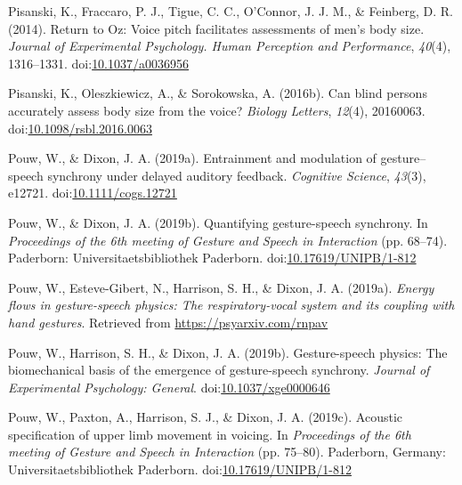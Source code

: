 \documentclass[
  man, noextraspace,floatsintext]{apa6}
\newlength{\cslhangindent}
\newenvironment{cslreferences}%
  {\setlength{\parindent}{0pt}%
  \everypar{\setlength{\hangindent}{\cslhangindent}}\ignorespaces}%
  {\par}
\begin{document}
\begin{cslreferences}
\leavevmode\hypertarget{ref-pisanskiReturnOzVoice2014}{}%
Pisanski, K., Fraccaro, P. J., Tigue, C. C., O'Connor, J. J. M., \& Feinberg, D. R. (2014). Return to Oz: Voice pitch facilitates assessments of men's body size. \emph{Journal of Experimental Psychology. Human Perception and Performance}, \emph{40}(4), 1316--1331. doi:\href{https://doi.org/10.1037/a0036956}{10.1037/a0036956}

\leavevmode\hypertarget{ref-pisanskiCanBlindPersons2016}{}%
Pisanski, K., Oleszkiewicz, A., \& Sorokowska, A. (2016b). Can blind persons accurately assess body size from the voice? \emph{Biology Letters}, \emph{12}(4), 20160063. doi:\href{https://doi.org/10.1098/rsbl.2016.0063}{10.1098/rsbl.2016.0063}

\leavevmode\hypertarget{ref-pouwEntrainmentModulationGesture2019}{}%
Pouw, W., \& Dixon, J. A. (2019a). Entrainment and modulation of gesture--speech synchrony under delayed auditory feedback. \emph{Cognitive Science}, \emph{43}(3), e12721. doi:\href{https://doi.org/10.1111/cogs.12721}{10.1111/cogs.12721}

\leavevmode\hypertarget{ref-pouwQuantifyingGesturespeechSynchrony2019}{}%
Pouw, W., \& Dixon, J. A. (2019b). Quantifying gesture-speech synchrony. In \emph{Proceedings of the 6th meeting of Gesture and Speech in Interaction} (pp. 68--74). Paderborn: Universitaetsbibliothek Paderborn. doi:\href{https://doi.org/10.17619/UNIPB/1-812}{10.17619/UNIPB/1-812}

\leavevmode\hypertarget{ref-pouwEnergyFlowsGesturespeech2019a}{}%
Pouw, W., Esteve-Gibert, N., Harrison, S. H., \& Dixon, J. A. (2019a). \emph{Energy flows in gesture-speech physics: The respiratory-vocal system and its coupling with hand gestures}. Retrieved from \url{https://psyarxiv.com/rnpav}

\leavevmode\hypertarget{ref-pouwGesturespeechPhysicsBiomechanical2019}{}%
Pouw, W., Harrison, S. H., \& Dixon, J. A. (2019b). Gesture-speech physics: The biomechanical basis of the emergence of gesture-speech synchrony. \emph{Journal of Experimental Psychology: General}. doi:\href{https://doi.org/10.1037/xge0000646}{10.1037/xge0000646}

\leavevmode\hypertarget{ref-pouwAcousticSpecificationUpper2019}{}%
Pouw, W., Paxton, A., Harrison, S. J., \& Dixon, J. A. (2019c). Acoustic specification of upper limb movement in voicing. In \emph{Proceedings of the 6th meeting of Gesture and Speech in Interaction} (pp. 75--80). Paderborn, Germany: Universitaetsbibliothek Paderborn. doi:\href{https://doi.org/10.17619/UNIPB/1-812}{10.17619/UNIPB/1-812}


\end{cslreferences}
\end{document}
